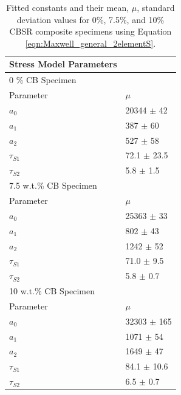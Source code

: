 \begin{table}[H]
	\caption{Fitted constants and their mean, $\mu$, standard deviation values for 0\%, 7.5\%, and 10\% CBSR composite specimens using Equation \ref{eqn:Maxwell_general_2elementS}.}
	\begin{center}
		\label{tab:generalised_model_constants}
		\begin{tabular}{l l}
			\textbf{Stress Model Parameters} \\ 
			\hline
			0 \% CB Specimen \\ 
			\hline
			Parameter & $\mu$ \\
			\hline
			$a_0$ & 20344 $\pm$ 42 \\
			$a_1$ & 387 $\pm$ 60 \\
			$a_2$ & 527 $\pm$ 58 \\
			$\tau_{S1}$ & 72.1 $\pm$ 23.5 \\
			$\tau_{S2}$ & 5.8 $\pm$ 1.5 \\
			\hline
			7.5 w.t.\% CB Specimen \\ 
			\hline
			Parameter & $\mu$ \\
			\hline
			$a_0$ & 25363 $\pm$ 33 \\
			$a_1$ & 802 $\pm$ 43 \\
			$a_2$ & 1242 $\pm$ 52 \\
			$\tau_{S1}$ & 71.0 $\pm$ 9.5 \\
			$\tau_{S2}$ & 5.8 $\pm$ 0.7 \\
			\hline
			10 w.t.\% CB Specimen \\
			\hline
			Parameter & $\mu$ \\
			\hline
			$a_0$ & 32303 $\pm$ 165 \\
			$a_1$ & 1071 $\pm$ 54 \\
			$a_2$ & 1649 $\pm$ 47 \\
			$\tau_{S1}$ & 84.1 $\pm$ 10.6 \\
			$\tau_{S2}$ & 6.5 $\pm$ 0.7 \\
			\hline
		\end{tabular}
	\end{center}
\end{table}
